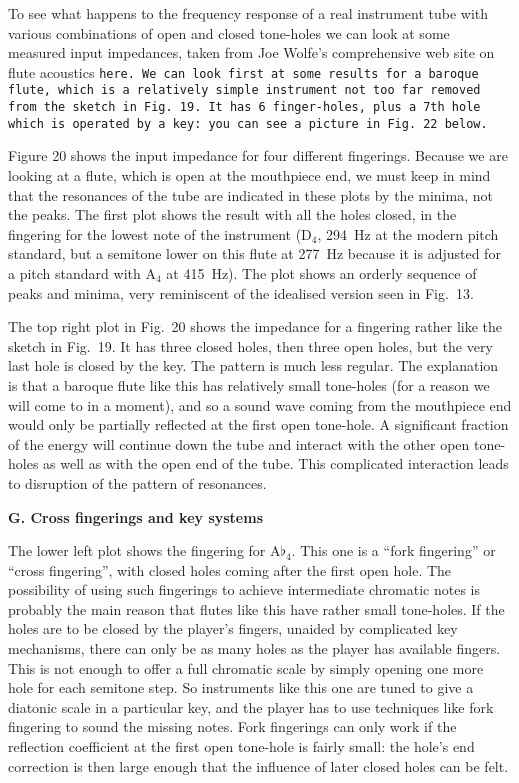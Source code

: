 
  To see what happens to the frequency response of a real instrument tube with 
  various combinations of open and closed tone-holes we can look at some 
  measured input impedances, taken from Joe Wolfe's comprehensive web site on 
  flute acoustics \tt{}here\rm{}. We can look first at some results for a 
  baroque flute, which is a relatively simple instrument not too far removed 
  from the sketch in Fig.\ 19. It has 6 finger-holes, plus a 7th hole which is 
  operated by a key: you can see a picture in Fig.\ 22 below. 

  Figure 20 shows the input impedance for four different fingerings. Because we 
  are looking at a flute, which is open at the mouthpiece end, we must keep in 
  mind that the resonances of the tube are indicated in these plots by the 
  minima, not the peaks. The first plot shows the result with all the holes 
  closed, in the fingering for the lowest note of the instrument 
  ($\mathrm{D}_4$, 294~Hz at the modern pitch standard, but a semitone lower on 
  this flute at 277~Hz because it is adjusted for a pitch standard with 
  $\mathrm{A}_4$ at 415~Hz). The plot shows an orderly sequence of peaks and 
  minima, very reminiscent of the idealised version seen in Fig.\ 13. 

  The top right plot in Fig.\ 20 shows the impedance for a fingering rather 
  like the sketch in Fig.\ 19. It has three closed holes, then three open 
  holes, but the very last hole is closed by the key. The pattern is much less 
  regular. The explanation is that a baroque flute like this has relatively 
  small tone-holes (for a reason we will come to in a moment), and so a sound 
  wave coming from the mouthpiece end would only be partially reflected at the 
  first open tone-hole. A significant fraction of the energy will continue down 
  the tube and interact with the other open tone-holes as well as with the open 
  end of the tube. This complicated interaction leads to disruption of the 
  pattern of resonances. 

  \textbf{G. Cross fingerings and key systems} 

  The lower left plot shows the fingering for $\mathrm{A}\flat_4$. This one is 
  a “fork fingering” or “cross fingering”, with closed holes coming after the 
  first open hole. The possibility of using such fingerings to achieve 
  intermediate chromatic notes is probably the main reason that flutes like 
  this have rather small tone-holes. If the holes are to be closed by the 
  player’s fingers, unaided by complicated key mechanisms, there can only be as 
  many holes as the player has available fingers. This is not enough to offer a 
  full chromatic scale by simply opening one more hole for each semitone step. 
  So instruments like this one are tuned to give a diatonic scale in a 
  particular key, and the player has to use techniques like fork fingering to 
  sound the missing notes. Fork fingerings can only work if the reflection 
  coefficient at the first open tone-hole is fairly small: the hole's end 
  correction is then large enough that the influence of later closed holes can 
  be felt. 

